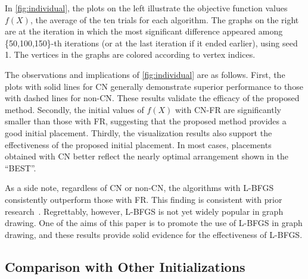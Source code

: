 \documentclass[11pt]{article}
\begin{document}
In \cref{fig:individual}, the plots on the left illustrate the objective
function values $f(X)$, the average of the ten trials for each algorithm. The
graphs on the right are at the iteration in which the most significant
difference appeared among \{50,100,150\}-th iterations (or at the last iteration
if it ended earlier), using seed 1.
The vertices in the graphs are colored according to vertex indices.

The observations and implications of \cref{fig:individual} are as follows.
First, the plots with solid lines for \textsf{CN} generally demonstrate
superior performance to those with dashed lines for non-\textsf{CN}. These
results validate the efficacy of the proposed method. Secondly, the
initial values of $f(X)$ with \textsf{CN-FR} are significantly smaller than
those with \textsf{FR}, suggesting that the proposed method provides a good
initial placement. Thirdly, the visualization results also support the
effectiveness of the proposed initial placement. In most cases, placements
obtained with \textsf{CN} better reflect the nearly optimal arrangement shown in
the ``BEST''.

As a side note, regardless of \textsf{CN} or non-\textsf{CN}, the algorithms with
\textsf{L-BFGS} consistently outperform those with \textsf{FR}. This finding
is consistent with prior research~\citep{6183577}. Regrettably, however, L-BFGS
is not yet widely popular in graph drawing. One of the aims of this paper is to
promote the use of L-BFGS in graph drawing, and these results provide solid
evidence for the effectiveness of L-BFGS.

\subsection{Comparison with Other Initializations}
\label{ssec:exprAll}
\end{document}

